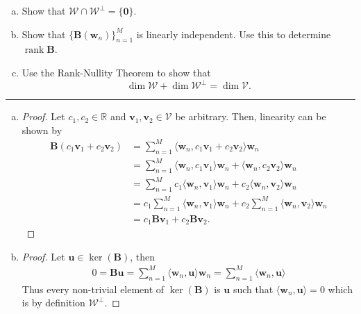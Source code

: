 \documentclass[12pt]{amsart}
\newcommand{\1}{\mathbbm{1}}
\newcounter{Theorem}
\numberwithin{equation}{section}
\numberwithin{Theorem}{section}
\theoremstyle{plain} %
\theoremstyle{definition}
\theoremstyle{remark}
\begin{document}
\begin{enumerate}[1.]
\begin{enumerate}[(a)]
\item Show that \(\mathcal{W}\cap\mathcal{W}^{\bot}=\{\mathbf{0}\}\).\medskip

\item Show that \(\{\mathbf{B}(\mathbf{w}_{n})\}_{n=1}^{M}\) is linearly independent. Use this to determine \(\operatorname{rank}\mathbf{B}\).\medskip

\item Use the Rank-Nullity Theorem to show that
\[\dim\mathcal{W} + \dim\mathcal{W}^{\bot} = \dim\mathcal{V}.\]

\end{enumerate}\bigskip

\hrule
\bigskip
\begin{enumerate}[(a)]
	\itemsep1em 
\item 
\begin{proof}
Let \(c_1,c_2\in\mathbb{R}\) and \(\mathbf{v}_1,\mathbf{v}_2\in\mathcal{V}\) be arbitrary. Then, linearity can be shown by
\begin{align*}
	\mathbf{B}(c_1\mathbf{v}_1+c_2\mathbf{v}_2)
	&= \sum_{n=1}^{M} \langle \mathbf{w}_n, c_1\mathbf{v}_1+c_2\mathbf{v}_2 \rangle\mathbf{w}_n \\
	&= \sum_{n=1}^{M} \langle \mathbf{w}_n, c_1\mathbf{v}_1 \rangle\mathbf{w}_n + \langle \mathbf{w}_n,c_2\mathbf{v}_2 \rangle\mathbf{w}_n \\
	&= \sum_{n=1}^{M} c_1\langle \mathbf{w}_n,\mathbf{v}_1 \rangle\mathbf{w}_n + c_2\langle \mathbf{w}_n,\mathbf{v}_2 \rangle\mathbf{w}_n \\
	&=  c_1\sum_{n=1}^{M}\langle \mathbf{w}_n,\mathbf{v}_1 \rangle\mathbf{w}_n + c_2\sum_{n=1}^{M}\langle \mathbf{w}_n,\mathbf{v}_2 \rangle\mathbf{w}_n \\
	&= c_1\mathbf{B}\mathbf{v}_1 + c_2\mathbf{B}\mathbf{v}_2 .
\end{align*}
\end{proof}

\item 
\begin{proof}
\begin{comment}
Let \(\{\mathbf{u}_n\}_{n=1}^N\) be a basis for for \(\mathcal{W}^\perp\). Then, for arbitrary \(\mathbf{u}\in\mathcal{W}^\perp\)
	\mathbf{B}\mathbf{u}
	= \sum_{n=1}^{M} \langle \mathbf{w}_n,\mathbf{u} \rangle\mathbf{w}_n
	= \sum_{n=1}^{M} 0 \, \mathbf{w}_n
	= 0 .
\end{comment}
Let \(\mathbf{u}\in\ker(\mathbf{B})\), then 
\begin{align*}
	0
	= \mathbf{B}\mathbf{u}
	= \sum_{n=1}^{M} \langle \mathbf{w}_n,\mathbf{u} \rangle\mathbf{w}_n
	= \sum_{n=1}^{M} \langle \mathbf{w}_n,\mathbf{u} \rangle
\end{align*}
Thus every non-trivial element of \(\ker(\mathbf{B})\) is \(\mathbf{u}\)
such that \(\langle \mathbf{w}_n,\mathbf{u} \rangle = 0\)
which is by definition \(\mathcal{W}^\perp\).
\end{proof}



\end{enumerate}
\end{enumerate}
\end{document}

